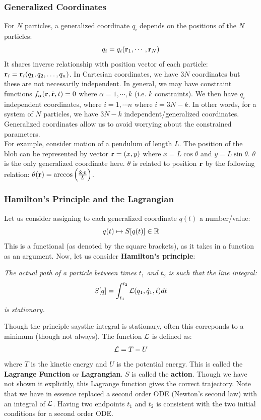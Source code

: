 \subsubsection{Generalized Coordinates}
For $N$ particles, a generalized coordinate $q_i$ depends on the positions of the $N$ particles:
\[q_i = q_i(\mathbf{r}_1, \cdots, \mathbf{r}_N)\]
It shares inverse relationship with position vector of each particle: $\mathbf{r}_i=\mathbf{r}_i (q_1, q_2, \dots, q_n)$. In Cartesian coordinates, we have $3N$ coordinates but these are not necessarily independent. In general, we may have constraint functions $f_\alpha(\mathbf{r}, \dot{\mathbf{r}}, t) = 0$ where $\alpha = 1, \cdots, k$ (i.e. $k$ constraints). We then have $q_i$ independent coordinates, where $i = 1, \cdots n$ where $i = 3N - k$. In other words, for a system of $N$ particles, we have $3N - k$ independent/generalized coordinates. Generalized coordinates allow us to avoid worrying about the constrained parameters. \\
\noindent
For example, consider motion of a pendulum of length $L$. The position of the blob can be represented by vector $\mathbf{r}=(x,y)$ where $x=L\cos\theta$ and $y=L\sin\theta$. $\theta$ is the only generalized coordinate here. $\theta$ is related to position $\mathbf{r}$ by the following relation: $\theta(\mathbf{r})=\arccos\left( \frac{\hat{\mathbf{x}} \cdot \mathbf{r}}{L} \right)$.
\subsubsection{Hamilton's Principle and the Lagrangian}
Let us consider assigning to each generalized coordinate $q(t)$ a number/value:
\[q(t) \mapsto S[q(t)] \in \mathbb{R}\]
This is a functional (as denoted by the square brackets), as it takes in a function as an argument. Now, let us consider \textbf{Hamilton's principle}:
\begin{center}
    \textit{The actual path of a particle between times $t_1$ and $t_2$ is such that the line integral:
    \[ S[q] = \int_{t_1}^{t_2} \mathcal{L}(q_1, \dot{q}_1, t) dt\]
    is stationary.}
\end{center}
Though the principle saysthe integral is stationary, often this correponds to a minimum (though not always). The function $\mathcal{L}$ is defined as:
\[\mathcal{L} = T - U\]
where $T$ is the kinetic energy and $U$ is the potential energy. This is called the \textbf{Lagrange Function} or \textbf{Lagrangian}. $S$ is called the \textbf{action}. Though we have not shown it explicitly, this Lagrange function gives the correct trajectory. Note that we have in essence replaced a second order ODE (Newton's second law) with an integral of $\mathcal{L}$. Having two endpoints $t_1$ and $t_2$ is consistent with the two initial conditions for a second order ODE. 